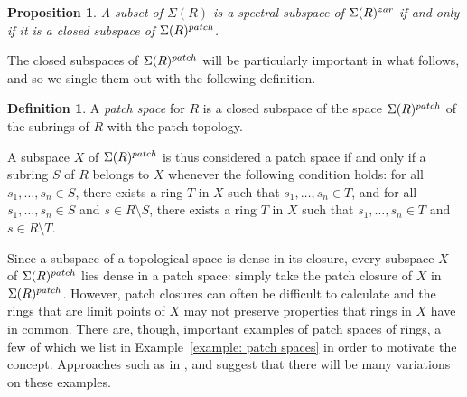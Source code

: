 \documentclass[11pt]{amsart}
\newtheorem{proposition}[theorem]{Proposition}
\theoremstyle{definition}
\newtheorem{definition}[theorem]{Definition}
\begin{document}
\begin{proposition}\label{prop: Hochster}
A subset of $\Sigma(R)$ is a spectral subspace of $\Sigma(R)^{\rm zar}$ if and only if it is a closed subspace of ${\Sigma}(R)^{\rm patch}$. 
\end{proposition}


The closed subspaces of $\Sigma(R)^{\rm patch}$ will be particularly important in what follows, and so we single them out with the following definition.



\begin{definition}\label{dfn: patch space} 
A {\it patch space} for $R$ is a closed subspace of the space ${\Sigma}(R)^{\rm patch}$ of the subrings of $R$ with the patch topology. 
\end{definition}
A subspace $X$ of ${\Sigma}(R)^{\rm patch}$ is thus considered a patch space if and only if a subring $S$ of $R$ belongs to $X$ whenever the following condition holds: for all
$s_1,\ldots,s_n \in S$, there exists a ring $T$ in $X$ such that $s_1,\ldots,s_n \in T$, and for all 
$s_1,\ldots,s_n \in S$ and $s \in R\setminus S$, there exists a ring $T$ in $X$ such that $s_1,\ldots,s_n \in T$ and $s \in R\setminus T$.


\medskip

Since a subspace of a topological space is dense in its closure, every subspace $X$ of ${\Sigma}(R)^{\rm patch}$ lies dense in a patch space: simply take the patch closure of $X$ in ${\Sigma}(R)^{\rm patch}$. 
However, patch closures can often be difficult to calculate and the rings that are limit points of $X$ may not preserve properties that rings in $X$ have in common. There are, though, important examples of patch spaces of rings, a few of which we list in Example~\ref{example: patch spaces} in order to motivate the concept. Approaches such as in \cite{Fin}, \cite{FFS} and \cite{OIrr} suggest that there will be many variations on these examples. 
\end{document}
